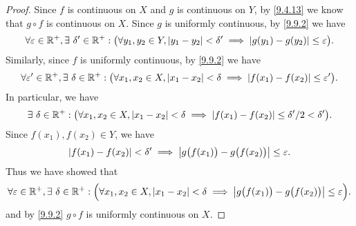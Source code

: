 \begin{proof}
  Since \(f\) is continuous on \(X\) and \(g\) is continuous on \(Y\), by \cref{9.4.13} we know that \(g \circ f\) is continuous on \(X\).
  Since \(g\) is uniformly continuous, by \cref{9.9.2} we have
  \[
    \forall \varepsilon \in \mathbb{R}^+, \exists\ \delta' \in \mathbb{R}^+ : \big(\forall y_1, y_2 \in Y, \left\lvert y_1 - y_2\right\rvert < \delta' \implies \left\lvert g(y_1) - g(y_2)\right\rvert \leq \varepsilon\big).
  \]
  Similarly, since \(f\) is uniformly continuous, by \cref{9.9.2} we have
  \[
    \forall \varepsilon' \in \mathbb{R}^+, \exists\ \delta \in \mathbb{R}^+ : \big(\forall x_1, x_2 \in X, \left\lvert x_1 - x_2\right\rvert < \delta \implies \left\lvert f(x_1) - f(x_2)\right\rvert \leq \varepsilon'\big).
  \]
  In particular, we have
  \[
    \exists\ \delta \in \mathbb{R}^+ : \big(\forall x_1, x_2 \in X, \left\lvert x_1 - x_2\right\rvert < \delta \implies \left\lvert f(x_1) - f(x_2)\right\rvert \leq \delta' / 2 < \delta'\big).
  \]
  Since \(f(x_1), f(x_2) \in Y\), we have
  \[
    \left\lvert f(x_1) - f(x_2)\right\rvert < \delta' \implies \left\lvert g\big(f(x_1)\big) - g\big(f(x_2)\big)\right\rvert \leq \varepsilon.
  \]
  Thus we have showed that
  \[
    \forall \varepsilon \in \mathbb{R}^+, \exists\ \delta \in \mathbb{R}^+ : \Big(\forall x_1, x_2 \in X, \left\lvert x_1 - x_2\right\rvert < \delta \implies \left\lvert g\big(f(x_1)\big) - g\big(f(x_2)\big)\right\rvert \leq \varepsilon\Big).
  \]
  and by \cref{9.9.2} \(g \circ f\) is uniformly continuous on \(X\).
\end{proof}